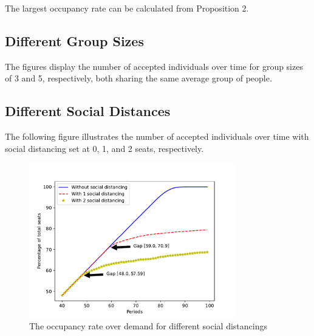 

The largest occupancy rate can be calculated from Proposition 2.



\subsection*{Different Group Sizes}
The figures display the number of accepted individuals over time for group sizes of 3 and 5, respectively, both sharing the same average group of people.


\subsection*{Different Social Distances}
The following figure illustrates the number of accepted individuals over time with social distancing set at 0, 1, and 2 seats, respectively.

\begin{figure}[ht]
  \centering
    \includegraphics[width=0.8\textwidth]{./Figures/distance.pdf}
  \caption{The occupancy rate over demand for different social distancings}
\end{figure}

